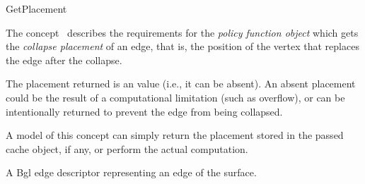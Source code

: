 
\begin{ccRefConcept}{GetPlacement}


\ccDefinition

The concept \ccRefName\ describes the requirements for the {\em policy
function object} which gets the {\em collapse placement} of an edge,
that is, the position of the vertex that replaces the edge after the
collapse.

The placement returned is an  value (i.e., it can
be absent). An absent placement could be the result of a
computational limitation (such as overflow), or can be intentionally
returned to prevent the edge from being collapsed.

A model of this concept can simply return the placement stored in the
passed cache object, if any, or perform the actual computation.

\ccRefines
{}

\ccTypes
\ccGlue    
\ccGlue    
\ccGlue    
  {A {\sc Bgl} edge descriptor representing an edge of the surface.}
\ccGlue    

\ccCreation
{}  %


\end{ccRefConcept}
